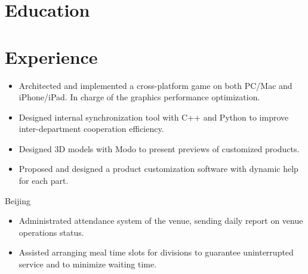 \documentclass[10pt,a4paper]{moderncv/moderncv}
\begin{document}
\maketitle

\section{Education}


\section{Experience}

{
\begin{itemize}
	\item Architected and implemented a cross-platform game on both PC/Mac and iPhone/iPad. In charge of the graphics performance optimization.
	\item Designed internal synchronization tool with C++ and Python to improve inter-department cooperation efficiency.
\end{itemize}
}

{
\begin{itemize}
	\item Designed 3D models with Modo to present previews of customized products.
	\item Proposed and designed a product customization software with dynamic help for each part.
\end{itemize}
}

{Beijing}{}
{
\begin{itemize}
	\item Administrated attendance system of the venue, sending daily report on venue operations status.
	\item Assisted arranging meal time slots for divisions to guarantee uninterrupted service and to minimize waiting time.
\end{itemize}
}
\end{document}
